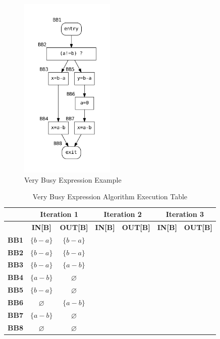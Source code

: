 \documentclass{article}
\begin{document}
\begin{figure}[H]
    \centering
    \includegraphics[width=0.4\textwidth]{graphs/very_busy.pdf}
    \caption{Very Busy Expression Example}
    \label{fig:very-busy}
\end{figure}

\begin{table}[H]
\centering
\begin{tabular}{|c|c|c|c|c|c|c|}
\hline
   & \multicolumn{2}{c|}{\textbf{Iteration 1}} & \multicolumn{2}{c|}{\textbf{Iteration 2}} & \multicolumn{2}{c|}{\textbf{Iteration 3}} \\ \hline
   & \textbf{IN[B]}   & \textbf{OUT[B]}   & \textbf{IN[B]}   & \textbf{OUT[B]}   & \textbf{IN[B]}   & \textbf{OUT[B]}   \\ \hline
    \textbf{BB1} & $\{b-a\}$ & $\{b-a\}$ & & & & \\ \hline
    \textbf{BB2} & $\{b-a\}$ & $\{b-a\}$ & & & & \\ \hline
    \textbf{BB3} & $\{b-a\}$ & $\{a-b\}$ & & & & \\ \hline
    \textbf{BB4} & $\{a-b\}$ & $\varnothing$ & & & & \\ \hline
    \textbf{BB5} & $\{b - a\}$ & $\varnothing$ & & & & \\ \hline
    \textbf{BB6} & $\varnothing$ & $\{a-b\}$ & & & & \\ \hline
    \textbf{BB7} & $\{a-b\}$ & $\varnothing$ & & & & \\ \hline
    \textbf{BB8} & $\varnothing$ & $\varnothing$ & & & & \\ \hline
\end{tabular}
\caption{Very Busy Expression Algorithm Execution Table}
\end{table}
\end{document}

